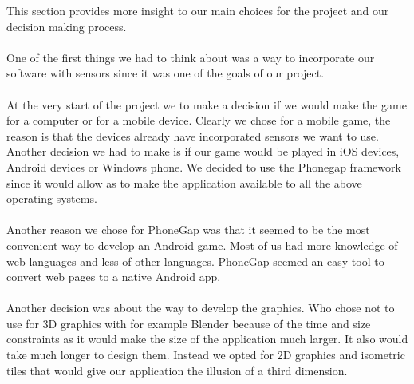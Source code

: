 This section provides more insight to our main choices for the project and our decision making process.
\\\\
One of the first things we had to think about was a way to incorporate our software with sensors since it was one of the goals of our project. 
\\\\
At the very start of the project we to make a decision if we would make the game for a computer or for a mobile device. Clearly we chose for a mobile game, the reason is that the devices already have incorporated sensors we want to use. Another decision we had to make is if our game would be played in iOS devices, Android devices or Windows phone. We decided to use the Phonegap framework since it would allow as to make the application available to all the above operating systems. 
\\\\
Another reason we chose for PhoneGap was that it seemed to be the most convenient way to develop an Android game. Most of us had more knowledge of web languages and less of other languages. PhoneGap seemed an easy tool to convert web pages to a native Android app. 
\\\\
Another decision was about the way to develop the graphics. Who chose not to use for 3D graphics with for example Blender because of the time and size constraints as it would make the size of the application much larger. It also would take much longer to design them. Instead we opted for 2D graphics and isometric tiles that would give our application the illusion of a third dimension.

